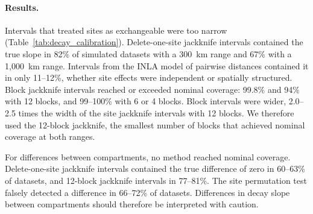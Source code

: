 \documentclass[11pt]{article}
\begin{document}
\paragraph{Results.}
Intervals that treated sites as exchangeable were too narrow (Table~\ref{tab:decay_calibration}). Delete-one-site jackknife intervals contained the true slope in 82\% of simulated datasets with a 300~km range and 67\% with a 1,000~km range. Intervals from the INLA model of pairwise distances contained it in only 11--12\%, whether site effects were independent or spatially structured. Block jackknife intervals reached or exceeded nominal coverage: 99.8\% and 94\% with 12 blocks, and 99--100\% with 6 or 4 blocks. Block intervals were wider, 2.0--2.5 times the width of the site jackknife intervals with 12 blocks. We therefore used the 12-block jackknife, the smallest number of blocks that achieved nominal coverage at both ranges.

For differences between compartments, no method reached nominal coverage. Delete-one-site jackknife intervals contained the true difference of zero in 60--63\% of datasets, and 12-block jackknife intervals in 77--81\%. The site permutation test falsely detected a difference in 66--72\% of datasets. Differences in decay slope between compartments should therefore be interpreted with caution.
\end{document}
